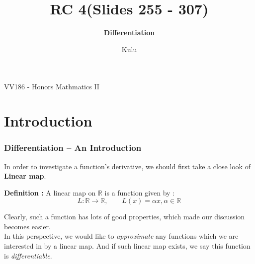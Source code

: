 \documentclass{beamer}
\title{\sffamily RC 4(Slides 255 - 307)}
\subtitle{\textbf{Differentiation}\\ }
\institute[UM-SJTU JI]{University of Michigan-Shanghai Jiao Tong University Joint Institute}
\author{Kulu}
\newcommand{\myfont}{\rmfamily\normalsize\upshape\mdseries}
\begin{document}
\begin{titlepage}
    \begin{center}
        VV186 - Honors Mathmatics II
    \end{center}
\end{titlepage}
\myfont



\section{Introduction}
\begin{frame}
    \frametitle{Differentiation -- An Introduction}

    In order to investigate a function's derivative, we should first take a close look of \textbf{Linear map}.

    \vspace{2em}
    \textbf{Definition : } A linear map on $\mathbb{R}$ is a function given by :
    \begin{equation*}
        L: \mathbb{R}\rightarrow\mathbb{R}, \qquad L(x)=\alpha x, \alpha \in \mathbb{R}
    \end{equation*}

    \vspace{1em}
    Clearly, such a function has lots of good properties, which made our discussion becomes easier.\\
    \vspace{1em}
    In this perspective, we would like to \emph{approximate} any functions which we are interested in by a linear map. And if
    such linear map exists, we say this function is \emph{differentiable}.
\end{frame}
\end{document}
